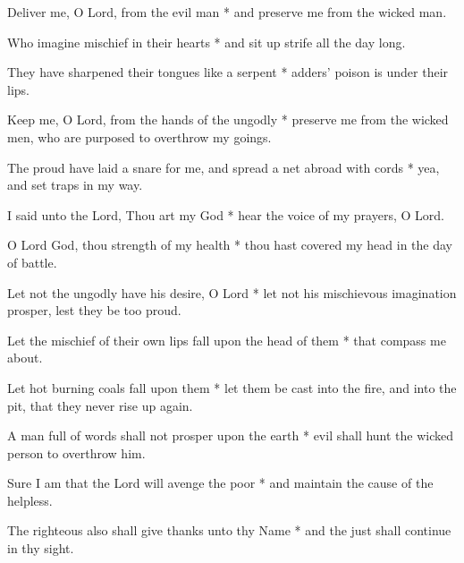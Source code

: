 \begin{multicols}{2}
	
	Deliver me, O Lord, from the evil man * and preserve me from the wicked man.
	
	Who imagine mischief in their hearts * and sit up strife all the day long.
	
	They have sharpened their tongues like a serpent * adders' poison is under their lips.
	
	Keep me, O Lord, from the hands of the ungodly * preserve me from the wicked men, who are purposed to overthrow my goings.
	
	The proud have laid a snare for me, and spread a net abroad with cords * yea, and set traps in my way.
	
	I said unto the Lord, Thou art my God * hear the voice of my prayers, O Lord.
	
	O Lord God, thou strength of my health * thou hast covered my head in the day of battle.
	
	Let not the ungodly have his desire, O Lord * let not his mischievous imagination prosper, lest they be too proud.
	
	Let the mischief of their own lips fall upon the head of them * that compass me about.
	
	Let hot burning coals fall upon them * let them be cast into the fire, and into the pit, that they never rise up again.
	
	A man full of words shall not prosper upon the earth * evil shall hunt the wicked person to overthrow him.
	
	Sure I am that the Lord will avenge the poor * and maintain the cause of the helpless.
	
	The righteous also shall give thanks unto thy Name * and the just shall continue in thy sight.
	
	\gloria{}
\end{multicols}